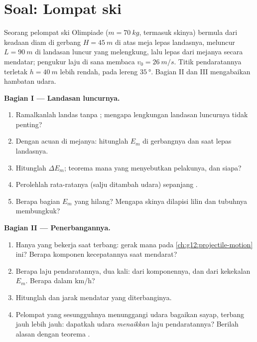 \section{Soal: Lompat ski}

\begin{problem}
\label{pb:g12:work-and-energy:1}
Seorang pelompat ski Olimpiade ($m = \qty{70}{kg}$, termasuk skinya) bermula dari
keadaan diam di gerbang $H = \qty{45}{m}$ di atas meja lepas landasnya, meluncur
$L = \qty{90}{m}$ di landasan luncur yang melengkung, lalu lepas dari mejanya secara mendatar;
pengukur laju di sana membaca $v_0 = \qty{26}{m/s}$. Titik pendaratannya terletak
$h = \qty{40}{m}$ lebih rendah, pada lereng $\qty{35}{\degree}$. Bagian II
dan III mengabaikan hambatan udara.

\medskip\noindent\textbf{Bagian I --- Landasan luncurnya.}
\begin{enumerate}
  \item Ramalkanlah  landas tanpa ; mengapa lengkungan
        landasan luncurnya tidak penting?
  \item Dengan acuan di mejanya: hitunglah $E_m$ di gerbangnya dan saat lepas landasnya.
  \item Hitunglah $\Delta E_m$; teorema mana yang menyebutkan pelakunya, dan siapa?
  \item Perolehlah   rata-ratanya (salju ditambah udara) sepanjang .
  \item Berapa bagian $E_m$ yang hilang? Mengapa skinya dilapisi lilin dan tubuhnya membungkuk?
\end{enumerate}

\medskip\noindent\textbf{Bagian II --- Penerbangannya.}
\begin{enumerate}[resume]
  \item Hanya  yang bekerja saat terbang: gerak mana pada
        \cref{ch:g12:projectile-motion} ini? Berapa komponen kecepatannya
        saat mendarat?
  \item Berapa laju pendaratannya, dua kali: dari komponennya, dan dari kekekalan
        $E_m$. Berapa dalam \unit{km/h}?
  \item Hitunglah  dan jarak mendatar yang diterbanginya.
  \item Pelompat yang sesungguhnya menunggangi udara bagaikan sayap, terbang jauh
        lebih jauh: dapatkah udara \emph{menaikkan} laju pendaratannya? Berilah alasan dengan
        teorema .
\end{enumerate}


\end{problem}
